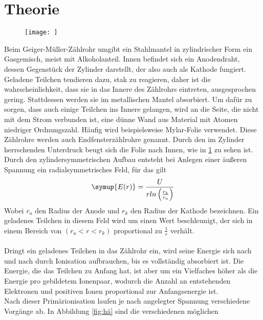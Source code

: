 \section{Theorie}
\label{sec:Theorie}

\begin{figure}
 \centering
 \texttt{[image: ]}
 \label{fig:aufn}
\end{figure}

Beim Geiger-Müller-Zählrohr umgibt ein Stahlmantel in zylindrischer Form
ein Gasgemisch, meist mit Alkoholanteil. Innen befindet sich ein Anodendraht,
dessen Gegenstück der Zylinder darstellt, der also auch als Kathode fungiert.\\
Geladene Teilchen tendieren dazu, stak zu reagieren, daher ist die wahrscheinlichkeit,
dass sie in das Innere des Zählrohrs eintreten, ausgesprochen gering. 
Stattdessen werden sie im metallischen Mantel absorbiert. Um dafür zu 
sorgen, dass auch einige Teilchen ins Innere gelangen, wird an die Seite,
die nicht mit dem Strom verbunden ist, eine dünne Wand aus Material mit Atomen
niedriger Ordnungszahl. Häufig wird beispielsweise Mylar-Folie verwendet. 
Diese Zählrohre werden auch Endfensterzählrohre genannt. Durch den im Zylinder
herrschenden Unterdruck beugt sich die Folie nach Innen, wie in \ref{fig:aufn} 
zu sehen ist.\\
Durch den zylindersymmetrischen Aufbau entsteht bei Anlegen einer äußeren Spannung
ein radialsymmetrisches Feld, für das gilt
\begin{equation}
\symup{E(r) }= \frac{U}{r ln\left(\frac{r_k}{r_a} \right) } 
\end{equation}
Wobei $r_a$ den Radius der Anode und $r_k$ den Radius der Kathode bezeichnen.
Ein geladenes Teilchen in diesem Feld wird um einen Wert beschleunigt, der
sich in einem Bereich von $\left( r_a < r < r_k \right)$ proportional zu $\frac{1}{r}$ 
verhält. \\
\\
Dringt ein geladenes Teilchen in das Zählrohr ein, wird seine Energie 
sich nach und nach durch Ionisation aufbrauchen, bis es vollständig absorbiert
ist. Die Energie, die das Teilchen zu Anfang hat, ist aber um ein Vielfaches
höher als die Energie pro gebildetem Ionenpaar, wodurch die Anzahl an 
entstehenden Elektronen und positiven Ionen proportional zur Anfangsenergie
ist. \\
Nach dieser Primärionisation laufen je nach angelegter Spannung verschiedene
Vorgänge ab. In Abbildung \ref{fig:hä} sind die verschiedenen möglichen
